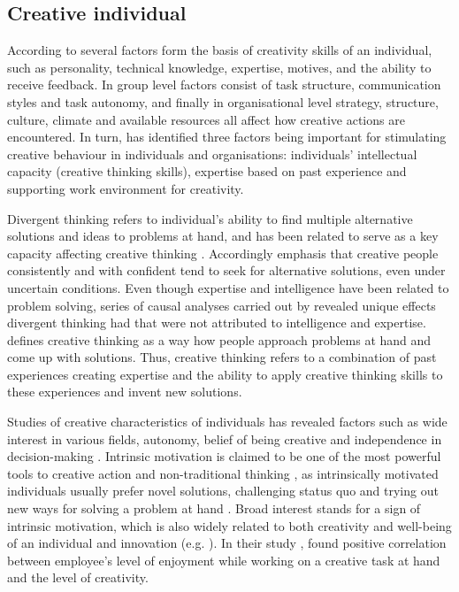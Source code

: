\subsection{Creative individual}
According to \citet{jung2003role} several factors form the basis of creativity skills of an individual, such as personality, technical knowledge, expertise, motives, and the ability to receive feedback. In group level factors consist of task structure, communication styles and task autonomy, and finally in organisational level strategy, structure, culture, climate and available resources all affect how creative actions are encountered. \citep{jung2003role} In turn, \citet{amabile1998kill} has identified three factors being important for stimulating creative behaviour in individuals and organisations: individuals' intellectual capacity (creative thinking skills), expertise based on past experience and supporting work environment for creativity. 

Divergent thinking refers to individual's ability to find multiple alternative solutions and ideas to problems at hand, and has been related to serve as a key capacity affecting creative thinking \citep{guilford1967creativity}. Accordingly \citet{mumford1988creativity} emphasis that creative people consistently and with confident tend to seek for alternative solutions, even under uncertain conditions. Even though expertise and  intelligence have been related to problem solving, series of causal analyses carried out by \citet{vincent2002divergent} revealed unique effects divergent thinking had that were not attributed to intelligence and expertise. \citet{amabile1996assessing} defines creative thinking as a way how people approach problems at hand and come up with solutions. Thus, creative thinking refers to a combination of past experiences creating expertise and the ability to apply creative thinking skills to these experiences and invent new solutions. \citep{amabile1998kill}

Studies of creative characteristics of individuals has revealed factors such as wide interest in various fields, autonomy, belief of being creative and independence in decision-making \citep{shalley2004leaders}. Intrinsic motivation is claimed to be one of the most powerful tools to creative action and non-traditional thinking \citep{amabile1996assessing,deciintrinsic,jung2001transformational}, as intrinsically motivated individuals usually prefer novel solutions, challenging status quo and trying out new ways for solving a problem at hand \citep{amabile2002creativity}. Broad interest stands for a sign of intrinsic motivation, which is also widely related to both creativity and well-being of an individual and innovation (e.g. \citep{hennessey19881,csikszentmihalyi199916,gardner1988creativity}). In their study  \citet{tierney1999examination}, found positive correlation between employee's level of enjoyment while working on a creative task at hand and the level of creativity. 

